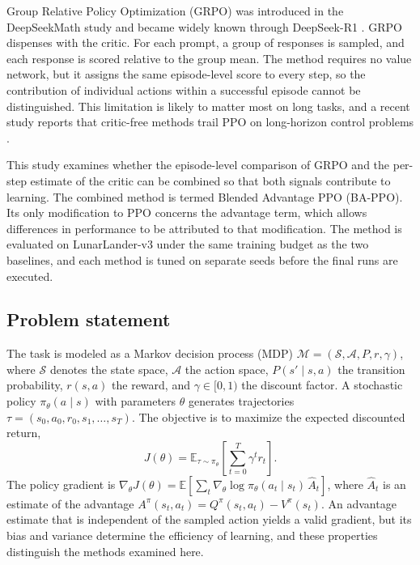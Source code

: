 \documentclass[11pt,a4paper]{article}
\begin{document}
Group Relative Policy Optimization (GRPO) was introduced in the DeepSeekMath study \cite{shao2024deepseekmath} and became widely known through DeepSeek-R1 \cite{deepseekai2025r1}. GRPO dispenses with the critic. For each prompt, a group of responses is sampled, and each response is scored relative to the group mean. The method requires no value network, but it assigns the same episode-level score to every step, so the contribution of individual actions within a successful episode cannot be distinguished. This limitation is likely to matter most on long tasks, and a recent study reports that critic-free methods trail PPO on long-horizon control problems \cite{marquesdeoliveira2025critics}.

This study examines whether the episode-level comparison of GRPO and the per-step estimate of the critic can be combined so that both signals contribute to learning. The combined method is termed Blended Advantage PPO (BA-PPO). Its only modification to PPO concerns the advantage term, which allows differences in performance to be attributed to that modification. The method is evaluated on LunarLander-v3 under the same training budget as the two baselines, and each method is tuned on separate seeds before the final runs are executed.

\subsection{Problem statement}
\label{sec:problem}

The task is modeled as a Markov decision process (MDP) $\mathcal{M} = (\mathcal{S}, \mathcal{A}, P, r, \gamma)$, where $\mathcal{S}$ denotes the state space, $\mathcal{A}$ the action space, $P(s' \mid s, a)$ the transition probability, $r(s,a)$ the reward, and $\gamma \in [0,1)$ the discount factor. A stochastic policy $\pi_\theta(a \mid s)$ with parameters $\theta$ generates trajectories $\tau = (s_0, a_0, r_0, s_1, \dots, s_T)$. The objective is to maximize the expected discounted return,
\begin{equation}
J(\theta) = \mathbb{E}_{\tau \sim \pi_\theta}\left[\sum_{t=0}^{T} \gamma^t r_t\right].
\label{eq:objective}
\end{equation}
The policy gradient is $\nabla_\theta J(\theta) = \mathbb{E}\left[\sum_t \nabla_\theta \log \pi_\theta(a_t \mid s_t)\, \hat{A}_t\right]$, where $\hat{A}_t$ is an estimate of the advantage $A^{\pi}(s_t, a_t) = Q^{\pi}(s_t, a_t) - V^{\pi}(s_t)$. An advantage estimate that is independent of the sampled action yields a valid gradient, but its bias and variance determine the efficiency of learning, and these properties distinguish the methods examined here.
\end{document}
